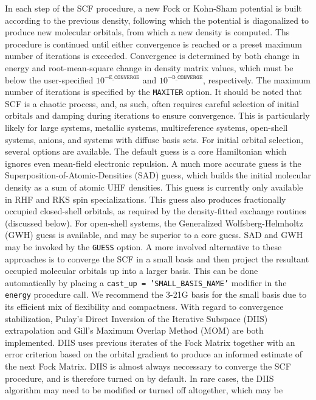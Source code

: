 In each step of the SCF procedure, a new Fock or Kohn-Sham potential is built
according to the previous density, following which the potential is diagonalized
to produce new molecular orbitals, from which a new density is computed. Ths
procedure is continued until either convergence is reached or a preset maximum
number of iterations is exceeded. Convergence is determined by both change in
energy and root-mean-square change in density matrix values, which must be below
the user-specified $10^{\mathtt{-E\_CONVERGE}}$ and $10^{-\mathtt{D\_CONVERGE}}$,
respectively. The maximum number of iterations is specified by the
\texttt{MAXITER} option. It should be noted that SCF is a chaotic process, and,
as such, often requires careful selection of initial orbitals and damping during
iterations to ensure convergence. This is particularly likely for large systems,
metallic systems, multireference systems, open-shell systems, anions, and
systems with diffuse basis sets. For initial orbital selection, several options
are available. The default guess is a core Hamiltonian which ignores even
mean-field electronic repulsion. A much more accurate guess is the
Superposition-of-Atomic-Densities (SAD) guess, which builds the initial
molecular density as a sum of atomic UHF densities. This guess is currently only
available in RHF and RKS spin specializations. This guess also produces
fractionally occupied closed-shell orbitals, as required by the density-fitted
exchange routines (discussed below). For open-shell systems, the Generalized
Wolfsberg-Helmholtz (GWH) guess is available, and may be superior to a core
guess. SAD and GWH may be invoked by the \texttt{GUESS} option. A more involved
alternative to these approaches is to converge the SCF in a small basis and then
project the resultant occupied molecular orbitals up into a larger basis. This
can be done automatically by placing a \texttt{cast\_up = 'SMALL\_BASIS\_NAME'}
modifier in the \texttt{energy} procedure call. We recommend the 3-21G basis for
the small basis due to its efficient mix of flexibility and compactness. With
regard to convergence stabilization, Pulay's Direct Inversion of the Iterative
Subspace (DIIS) extrapolation and Gill's Maximum Overlap Method (MOM) are both
implemented. DIIS uses previous iterates of the Fock Matrix together with an
error criterion based on the orbital gradient to produce an informed estimate of
the next Fock Matrix. DIIS is almost always neccessary to converge the SCF
procedure, and is therefore turned on by default. In rare cases, the DIIS
algorithm may need to be modified or turned off altogether, which may be
